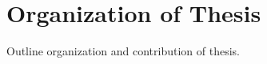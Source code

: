 \section{Organization of Thesis}
\label{sec:intro:org}

Outline organization and contribution of thesis.
